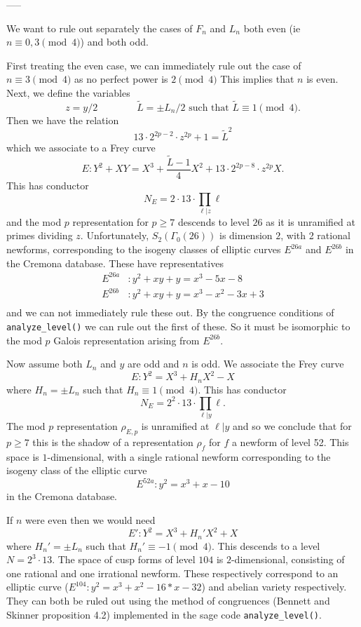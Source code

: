 \documentclass[12pt]{article}
\begin{document}
\begin{enumerate}
-----


We want to rule out separately the cases of $F_n$ and $L_n$ both even (ie $n \equiv 0,3 \pmod{4}$) and both odd.

First treating the even case, we can immediately rule out the case of $n \equiv 3 \pmod{4}$ as no perfect power is $2 \pmod{4}$  This implies that $n$ is even.  Next, we define the variables
\[ z = y/2 \qquad \qquad \tilde{L} = \pm L_n/2 \text{ such that } \tilde{L} \equiv 1 \pmod{4}. \]
Then we have the relation
\[ 13 \cdot 2^{2p-2} \cdot z^{2p}+1 = \tilde{L}^2 \] 
which we associate to a Frey curve
\[E: Y^2 +XY = X^3 +\frac{\tilde{L}-1}{4} X^2 +13 \cdot 2^{2p-8} \cdot z^{2p} X .\]
This has conductor
\[ N_E = 2 \cdot 13 \cdot \prod_{\ell | z} \ell \]
and the mod $p$ representation for $p \geq 7$ descends to level $26$ as it is unramified at primes dividing $z$.  Unfortunately, $S_2(\Gamma_0(26))$ is dimension $2$, with 2 rational newforms, corresponding to the isogeny classes of elliptic curves $E^{26a}$ and $E^{26b}$ in the Cremona database.  These have representatives
\begin{align*}
E^{26a} & : y^2 + xy + y = x^3 - 5x - 8 \\
E^{26b} & : y^2 + xy + y = x^3 - x^2 - 3x + 3 \\
\end{align*}
and we can not immediately rule these out.  By the congruence conditions of \texttt{analyze\_level()} we can rule out the first of these.  So it must be isomorphic to the mod $p$ Galois representation arising from $E^{26b}$.

Now assume both $L_n$ and $y$ are odd and $n$ is odd.  We associate the Frey curve
\[ E: Y^2 = X^3 + H_nX^2 - X \]
where $H_n = \pm L_n$ such that $H_n \equiv 1 \pmod{4}$.  
This has conductor
\[ N_E = 2^2 \cdot 13 \cdot \prod_{\ell | y} \ell. \]
The mod $p$ representation $\rho_{E,p}$ is unramified at $\ell | y$ and so we conclude that for $p \geq 7$ this is the shadow of a representation $\rho_f$ for $f$ a newform of level 52.  This space is $1$-dimensional, with a single rational newform corresponding to the isogeny class of the elliptic curve
\[ E^{52a}: y^2 = x^3 + x - 10\]
in the Cremona database.

If $n$ were even then we would need
\[ E': Y^2 = X^3 + H_n'X^2 + X \]
where $H_n' = \pm L_n$ such that $H_n' \equiv -1 \pmod{4}$.  This descends to a level $N = 2^3 \cdot 13$.  The space of cusp forms of level $104$ is $2$-dimensional, consisting of one rational and one irrational newform.  These respectively correspond to an elliptic curve ($E^{104}: y^2 = x^3 + x^2 - 16*x - 32$) and abelian variety respectively.  They can both be ruled out using the method of congruences (Bennett and Skinner proposition 4.2) implemented in the sage code \texttt{analyze\_level()}.




\end{enumerate}
\end{document}
